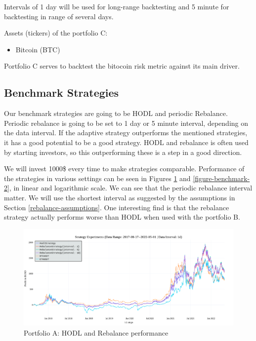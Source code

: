 Intervals of 1 day will be used for long-range backtesting and 5 minute for backtesting in range of several days.

Assets (tickers) of the portfolio C:
\begin{itemize}
    \item Bitcoin (BTC)
\end{itemize}

Portfolio C serves to backtest the bitocoin risk metric against its main driver.


\subsection*{Benchmark Strategies}
Our benchmark strategies are going to be HODL and periodic Rebalance. Periodic rebalance is going to be set to 1 day or 5 minute interval, depending on the data interval. If the adaptive strategy outperforms the mentioned strategies, it has a good potential to be a good strategy. HODL and rebalance is often used by starting investors, so this outperforming these is a step in a good direction.

We will invest 1000\$ every time to make strategies comparable. Performance of the strategies in various settings can be seen in Figures \ref{figure-benchmark-1} and \ref{figure-benchmark-2}, in linear and logarithmic scale. We can see that the periodic rebalance interval matter. We will use the shortest interval as suggested by the assumptions in Section \ref{rebalance-assumptions}. One interesting find is that the rebalance strategy actually performs worse than HODL when used with the portfolio B.

\begin{figure}[!hbt]
    \centering
    \includegraphics[width=\columnwidth]{figures/benchmark-A.png}
    \caption{Portfolio A: HODL and Rebalance performance}
    \label{figure-benchmark-1}
\end{figure}


